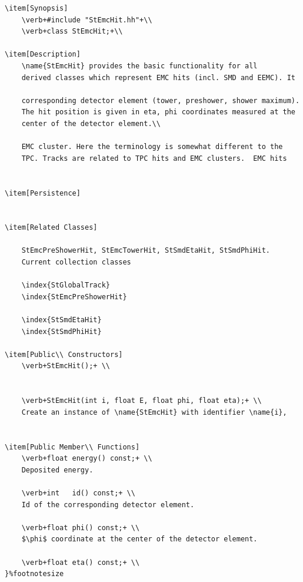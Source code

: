 \begin{enumerate}
{\begin{verbatim}
\item[Synopsis]
    \verb+#include "StEmcHit.hh"+\\
    \verb+class StEmcHit;+\\

\item[Description]
    \name{StEmcHit} provides the basic functionality for all
    derived classes which represent EMC hits (incl. SMD and EEMC). It
    
    corresponding detector element (tower, preshower, shower maximum).
    The hit position is given in eta, phi coordinates measured at the
    center of the detector element.\\
    
    EMC cluster. Here the terminology is somewhat different to the
    TPC. Tracks are related to TPC hits and EMC clusters.  EMC hits
    

\item[Persistence]
    

\item[Related Classes]
    
    StEmcPreShowerHit, StEmcTowerHit, StSmdEtaHit, StSmdPhiHit.
    Current collection classes
    
    \index{StGlobalTrack}
    \index{StEmcPreShowerHit}
    
    \index{StSmdEtaHit}
    \index{StSmdPhiHit}
    
\item[Public\\ Constructors]
    \verb+StEmcHit();+ \\
    

    \verb+StEmcHit(int i, float E, float phi, float eta);+ \\
    Create an instance of \name{StEmcHit} with identifier \name{i},
   

\item[Public Member\\ Functions]
    \verb+float energy() const;+ \\
    Deposited energy.

    \verb+int   id() const;+ \\
    Id of the corresponding detector element.

    \verb+float phi() const;+ \\
    $\phi$ coordinate at the center of the detector element.

    \verb+float eta() const;+ \\
}%footnotesize    


\end{verbatim}}
\end{enumerate}
